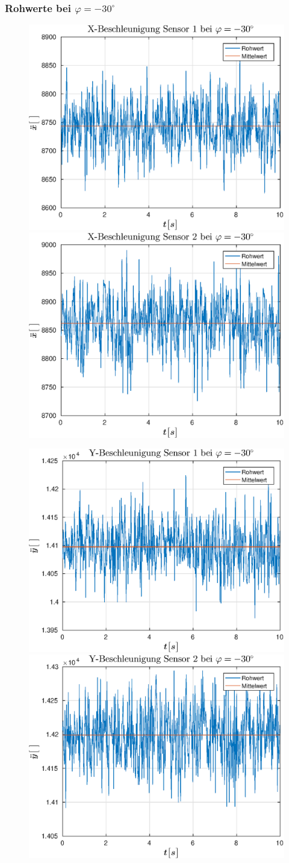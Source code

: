 \newpage
{\subsubsection{Rohwerte bei $\varphi = -30^{\circ}$}
\begin{figure}[h]
	\includegraphics[width=0.5\linewidth]{img/X1__dd___phi_-30.eps}
	\includegraphics[width=0.5\linewidth]{img/X2__dd___phi_-30.eps}
\end{figure}
\begin{figure}[h]
	\includegraphics[width=0.5\linewidth]{img/Y1__dd___phi_-30.eps}
	\includegraphics[width=0.5\linewidth]{img/Y2__dd___phi_-30.eps}
\end{figure}}

